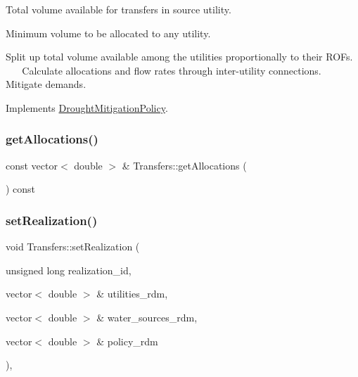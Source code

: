 Total volume available for transfers in source utility.

Minimum volume to be allocated to any utility.

Split up total volume available among the utilities proportionally to their R\+O\+Fs. ~\newline
~\newline
 Calculate allocations and flow rates through inter-\/utility connections. ~\newline
 Mitigate demands. 

Implements \mbox{\hyperlink{classDroughtMitigationPolicy_a76c1a85eaf7707306fe173b6437cc31d}{Drought\+Mitigation\+Policy}}.

\mbox{\label{classTransfers_a6c687c9f767ea915eead1f5db18711a2}} 
\subsubsection{\texorpdfstring{get\+Allocations()}{getAllocations()}}
{\footnotesize\ttfamily const vector$<$ double $>$ \& Transfers\+::get\+Allocations (\begin{DoxyParamCaption}{ }\end{DoxyParamCaption}) const}

\mbox{\label{classTransfers_a75342a7c14b2ff69eb2520de240a1131}} 
\subsubsection{\texorpdfstring{set\+Realization()}{setRealization()}}
{\footnotesize\ttfamily void Transfers\+::set\+Realization (\begin{DoxyParamCaption}\item[{unsigned long}]{realization\+\_\+id,  }\item[{vector$<$ double $>$ \&}]{utilities\+\_\+rdm,  }\item[{vector$<$ double $>$ \&}]{water\+\_\+sources\+\_\+rdm,  }\item[{vector$<$ double $>$ \&}]{policy\+\_\+rdm }\end{DoxyParamCaption})\hspace{0.3cm}{\ttfamily [override]}, {\ttfamily [virtual]}}



